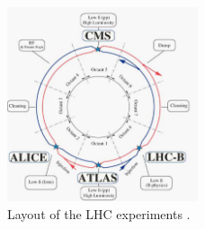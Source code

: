 \begin{figure}
\centering
\includegraphics[width=0.5\textwidth]{figures/lhc_and_cms/lhc_layout.png}
\caption{Layout of the LHC experiments \cite{lhc_machine}.}
\label{lhc_layout}
\end{figure}